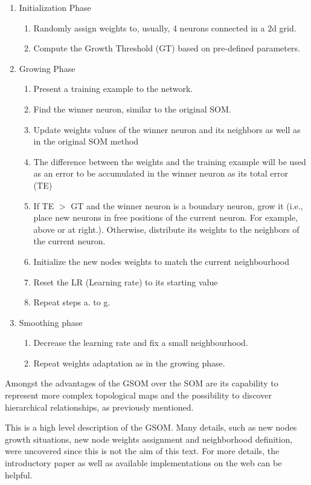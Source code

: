 \begin{enumerate}
    \item Initialization Phase
    \begin{enumerate}
        \item Randomly assign weights to, usually, 4 neurons connected in a 2d grid.
        \item Compute the Growth Threshold (GT) based on pre-defined parameters. 
    \end{enumerate}
    \item Growing Phase 
    \begin{enumerate}
        \item Present a training example to the network.
        \item Find the winner neuron, similar to the original SOM.
        \item Update weights values of the winner neuron and its neighbors as well as in the original SOM method
        \item The difference between the weights and the training example will be used as an error to be accumulated in the winner neuron as its total error (TE)
        \item If TE $>$ GT and the winner neuron is a boundary neuron, grow it (i.e., place new neurons in free positions of the current neuron. For example, above or at right.). Otherwise, distribute its weights to the neighbors of the current neuron.
        \item Initialize the new nodes weights to match the current neighbourhood
        \item Reset the LR (Learning rate) to its starting value
        \item Repeat steps a. to g.
    \end{enumerate}
    \item Smoothing phase
    \begin{enumerate}
        \item Decrease the learning rate and fix a small neighbourhood.
        \item Repeat weights adaptation as in the growing phase.
    \end{enumerate}
\end{enumerate}

Amongst the advantages of the GSOM over the SOM are its capability to represent more complex topological maps and the possibility to discover hierarchical relationships, as previously mentioned.

This is a high level description of the GSOM. Many details, such as new nodes growth situations, new node weights assignment and neighborhood definition, were uncovered since this is not the aim of this text. For more details, the introductory paper \cite{Alahakoon:2000} as well as available implementations on the web can be helpful.


